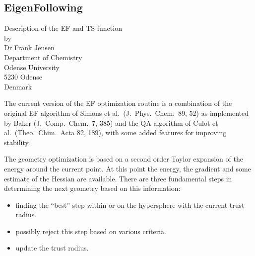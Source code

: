 \subsection{EigenFollowing}\label{t_ef}
\begin{center}
Description of the EF and TS function \\
by\\
Dr Frank Jensen  \\
Department of Chemistry  \\
Odense University  \\
5230 Odense  \\
Denmark
\end{center}

The current version of the EF optimization routine is a combination of the 
original EF algorithm of Simons et al.\ (J.\ Phys.\ Chem.\ 89, 52) as
implemented by  Baker (J.\ Comp.\ Chem.\ 7, 385) and the QA algorithm of Culot
et al.\  (Theo.\ Chim.\ Acta 82, 189), with some added features for improving
stability.

The geometry optimization is based on a second order Taylor expansion of  the
energy around the current point. At this point the energy, the gradient  and
some estimate of the Hessian are available. There are three fundamental  steps
in determining the next geometry based on this information:
\begin{itemize}
\item  finding the ``best'' step within or on the hypersphere with 
    the current trust radius.
\item possibly reject this step based on various criteria.
\item update the trust radius.
\end{itemize}

